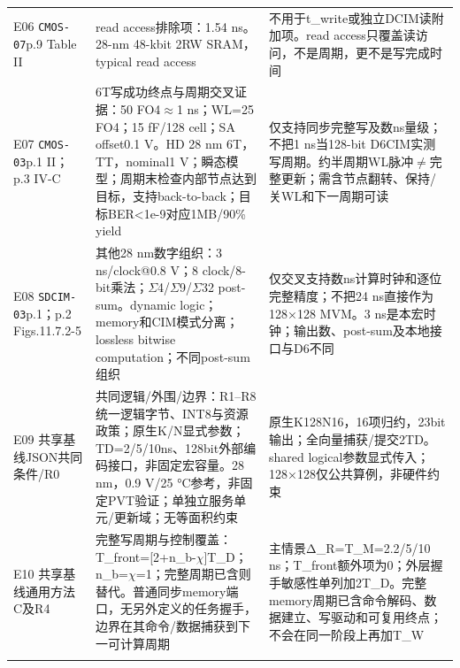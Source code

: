 \begin{longtable}{@{}>{\raggedright\arraybackslash}p{27mm}>{\raggedright\arraybackslash}p{62mm}>{\raggedright\arraybackslash}p{65mm}@{}}
E06 \texttt{CMOS-07}\newline p.9 Table II & read access排除项：1.54 ns。28-nm 48-kbit 2RW SRAM，typical read access & 不用于t\_write或独立DCIM读附加项。read access只覆盖读访问，不是周期，更不是写完成时间\\\addlinespace[2pt]
E07 \texttt{CMOS-03}\newline p.1 II；p.3 IV-C & 6T写成功终点与周期交叉证据：50 FO4$\approx$1 ns；WL=25 FO4；15 fF/128 cell；SA offset0.1 V。HD 28 nm 6T，TT，nominal1 V；瞬态模型；周期末检查内部节点达到目标，支持back-to-back；目标BER<1e-9对应1MB/90\% yield & 仅支持同步完整写及数ns量级；不把1 ns当128-bit D6CIM实测写周期。约半周期WL脉冲$\ne$完整更新；需含节点翻转、保持/关WL和下一周期可读\\\addlinespace[2pt]
E08 \texttt{SDCIM-03}\newline p.1；p.2 Figs.11.7.2-5 & 其他28 nm数字组织：3 ns/clock@0.8 V；8 clock/8-bit乘法；$\Sigma$4/$\Sigma$9/$\Sigma$32 post-sum。dynamic logic；memory和CIM模式分离；lossless bitwise computation；不同post-sum组织 & 仅交叉支持数ns计算时钟和逐位完整精度；不把24 ns直接作为128×128 MVM。3 ns是本宏时钟；输出数、post-sum及本地接口与D6不同\\\addlinespace[2pt]
E09 共享基线\newline JSON共同条件/R0 & 共同逻辑/外围/边界：R1–R8统一逻辑字节、INT8与资源政策；原生K/N显式参数；TD=2/5/10ns、128bit外部编码接口，非固定宏容量。28 nm，0.9 V/25 °C参考，非固定PVT验证；单独立服务单元/更新域；无等面积约束 & 原生K128N16，16项归约，23bit输出；全向量捕获/提交2TD。shared logical参数显式传入；128×128仅公共算例，非硬件约束\\\addlinespace[2pt]
E10 共享基线\newline 通用方法C及R4 & 完整写周期与控制覆盖：T\_front=[2+n\_b-$\chi$]T\_D；n\_b=$\chi$=1；完整周期已含则替代。普通同步memory端口，无另外定义的任务握手，边界在其命令/数据捕获到下一可计算周期 & 主情景Δ\_R=T\_M=2.2/5/10 ns；T\_front额外项为0；外层握手敏感性单列加2T\_D。完整memory周期已含命令解码、数据建立、写驱动和可复用终点；不会在同一阶段上再加T\_W\\\addlinespace[2pt]
\bottomrule\end{longtable}\endgroup
